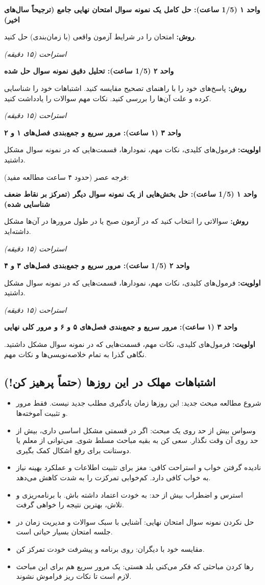 \documentclass[12pt]{article}
\newcommand{\unithead}[1]{\par\vspace{1ex}\noindent\textbf{#1}\par\nopagebreak[4]\vspace{0.5ex}}
\newcommand{\休息}[1]{\par\centering\textit{#1}\par\vspace{1ex}} %
\begin{document}
\unithead{واحد ۱ (1/5 ساعت): حل کامل یک نمونه سوال امتحان نهایی جامع (ترجیحاً سال‌های اخیر)}
\noindent\textbf{روش: }امتحان را در شرایط آزمون واقعی (با زمان‌بندی) حل کنید.

\休息{استراحت (۱۵ دقیقه)}

\unithead{واحد ۲ (1/5 ساعت): تحلیل دقیق نمونه سوال حل شده}
\noindent\textbf{روش: }پاسخ‌های خود را با راهنمای تصحیح مقایسه کنید. اشتباهات خود را شناسایی کرده و علت آن‌ها را بررسی کنید. نکات مهم سوالات را یادداشت کنید.

\休息{استراحت (۱۵ دقیقه)}

\unithead{واحد ۳ (۱ ساعت): مرور سریع و جمع‌بندی فصل‌های ۱ و ۲}
\noindent\textbf{اولویت: }فرمول‌های کلیدی، نکات مهم، نمودارها، قسمت‌هایی که در نمونه سوال مشکل داشتید.

\vspace{1em}
فرجه عصر (حدود ۴ ساعت مطالعه مفید):

\unithead{واحد ۱ (1/5 ساعت): حل بخش‌هایی از یک نمونه سوال دیگر (تمرکز بر نقاط ضعف شناسایی شده)}
\noindent\textbf{روش: }سوالاتی را انتخاب کنید که در آزمون صبح یا در طول مرورها در آن‌ها مشکل داشته‌اید.

\休息{استراحت (۱۵ دقیقه)}

\unithead{واحد ۲ (1/5 ساعت): مرور سریع و جمع‌بندی فصل‌های ۳ و ۴}
\noindent\textbf{اولویت: }فرمول‌های کلیدی، نکات مهم، نمودارها، قسمت‌هایی که در نمونه سوال مشکل داشتید.

\休息{استراحت (۱۵ دقیقه)}

\unithead{واحد ۳ (۱ ساعت): مرور سریع و جمع‌بندی فصل‌های ۵ و ۶ و مرور کلی نهایی}
\noindent\textbf{اولویت: }فرمول‌های کلیدی، نکات مهم، قسمت‌هایی که در نمونه سوال مشکل داشتید. نگاهی گذرا به تمام خلاصه‌نویسی‌ها و نکات مهم.

\subsection*{اشتباهات مهلک در این روزها (حتماً پرهیز کن!)}
\begin{itemize}
    \item شروع مطالعه مبحث جدید: این روزها زمان یادگیری مطلب جدید نیست. فقط مرور و تثبیت آموخته‌ها.
    \item وسواس بیش از حد روی یک مبحث: اگر در قسمتی مشکل اساسی داری، بیش از حد روی آن وقت نگذار. سعی کن به بقیه مباحث مسلط شوی. می‌توانی از معلم یا دوستانت برای رفع اشکال کمک بگیری.
    \item نادیده گرفتن خواب و استراحت کافی: مغز برای تثبیت اطلاعات و عملکرد بهینه نیاز به خواب کافی دارد. کم‌خوابی تمرکزت را به شدت کاهش می‌دهد.
    \item استرس و اضطراب بیش از حد: به خودت اعتماد داشته باش. با برنامه‌ریزی و تلاش، بهترین نتیجه را خواهی گرفت.
    \item حل نکردن نمونه سوال امتحان نهایی: آشنایی با سبک سوالات و مدیریت زمان در جلسه امتحان بسیار حیاتی است.
    \item مقایسه خود با دیگران: روی برنامه و پیشرفت خودت تمرکز کن.
    \item رها کردن مباحثی که فکر می‌کنی بلد هستی: یک مرور سریع هم برای این مباحث لازم است تا نکات ریز فراموش نشوند.
\end{itemize}
\end{document}
